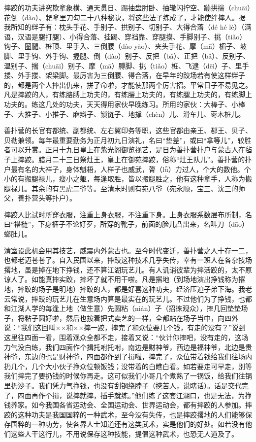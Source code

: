 \documentclass[12pt,UTF8]{ctexbook}
\begin{document}
摔跤的功夫讲究欺拿象横、通天贯日、踢抽盘肘卧、抽辙闪拧空、蹦拱揣（chuāi）花倒（dào）、耙拿里刀勾二十八种秘诀，将这些法子练成了，才能使绊摔人。据我所知的绊子有：枕头手花、手别子、拱别子、切别子、大得合落（dé hé lè）（满语，汉语是腿打腿）、小得合落、挂踢、穿裆靠、穿腿摸、手脚别子、挑（tiǎo）钩子、圈腿、桩顶、里手入、三倒腰（dào yào）、夹头手花、摩（mā）楣子、坡脚、里手钩、外手钩、握腿、倒（dào）别子、反把（bǎ）、正把（bǎ）、反别子、温别子、揣（chuāi）别子、摩（mā）膊脚、挑（tiǎo）桩、飞逮（dēi）子、里手搂、外手搂、架梁脚。最厉害为三倒腰、得合落，在早年的跤场若有使这样绊子的，都是两个人摔出仇来，拼了命啦，才能使那两个厉害招。平常日子不易见之。凡是摔跤的人，有练胳膊上功夫的，有练腰上功夫的，有练腿上功夫的，有练脚上功夫的。练这几处的功夫，天天得用家伙早晚练习。所用的家伙：大棒子、小棒子、大推子、小推子、麻辫子、锁链子、地撑（chèn）儿、滑车儿、枣木桩儿。

善扑营的长官有都统、副都统、左右翼印务等职，这些官都由亲王、郡王、贝子、贝勒兼领。每年最重要勤务为正月初九日演礼，名曰“垫差”，或曰“拿等儿”，较胜者可以升赏。正月十九日皇上在紫光阁御览视艺，是日为善扑营扑户与蒙古人在毡子上摔跤。腊月二十三日祭灶王，皇上在御苑摔跤，俗称“灶王队儿”。善扑营的扑户最有名的大祥子，身体魁梧，人样子也威武，膂（lǚ）力过人，个大的数他。个小的有搬腿禄儿，瘦小之躯，每逢取胜，皆以搬腿胜之，他有这种拿手，人称为搬腿禄儿。其余的有黑虎二爷等。至清末时则有宛八爷（宛永顺，宝三、沈三的师父，善扑营头等扑户）。

摔跤人比试时所穿衣服，注重上身衣服，不注重下身。上身衣服系数层布所制，名曰“褡裢”，下身裤子不论好歹，所穿的靴子，前面的脸儿凸出来，名叫刀（dāo）螂肚儿。

清室设此机会用其技艺，威震内外蒙古也。至今时代变迁，善扑营之人十存一二，也都老迈苍苍了。自入民国以来，摔跤这种技术几乎失传，幸有一班人在各杂技场撂地，虽是掉在地下挣钱，还不算江湖玩艺儿。有人讥诮彼辈为摔活跤的，太不原谅人了。如能真摔实跤，摔坏了就不用干啦。凡是撂地（到场地演出挣钱称为撂地，摔跤的场子是明地）摔跤的人，都是好喜这种功夫，经济压迫子弟下海。我老云常说，摔跤的玩艺儿在生意场内算是最实在的玩艺儿。不过他们为了挣钱，也都和江湖人学的每逢上地（做生意）先圆粘（nián）子（招徕观众），摔几回垫垫场子，将粘子圆好啦，然后也按着把式卖艺的一样，全都站在场子当中，向四外说：“我们这回叫××和××摔一跤，摔完了和众位要几个钱，有走的没有？”说到这里往四面一看，围着观众全都不走，接着又说：“伙计你摔吧，没有走的，这场力气没白练，我们四面作个揖托咐托咐，南边是财神爷，西边是福神爷，北边是贵神爷，东边的也是财神爷，四面都作到了揖啦，摔完了，众位带着钱给我们往场内扔几个，几个大小伙子挣众位顿饭钱；没带着的白瞧白看。如若要走可早走，别等我们摔完了要扔钱的时候你再走。这可似我们小哥几个煮熟了一锅饭，给我们往锅里扔沙子。我们凭力气挣钱，也没有刮钢绕脖子（挖苦人，说瞎话）。话是交代完了，四面再作个揖，说摔就摔，插手就练。”他们练了这套江湖口，也是无法，为挣钱养家。如今我国各省运动会、全国运动会、世界运动会，都有摔跤的人参加。摔跤的这种功夫是我国国粹的一种武术，至今没有失传，也是摔跤撂地的人们能够保存国粹的一种功劳，使各界人士知道还有这类武术，实是他们的好处。如若没有他们这些人干这行儿，不用说保存这种技能，提倡这种武术，也恐无人道及了。
\end{document}
